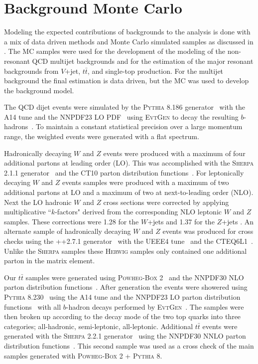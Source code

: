 \section{Background Monte Carlo} \label{sec:data:bkg_mc}

Modeling the expected contributions of backgrounds to the analysis is done with
a mix of data driven methods and Monte Carlo simulated samples as discussed in
.  The MC samples were used for the development of the
modeling of the non-resonant QCD multijet backgrounds and for the estimation
of the major resonant backgrounds from $V$+jet, $t\bar{t}$, and single-top
production.  For the multijet background the final estimation is data driven,
but the MC was used to develop the background model.

The QCD dijet events were simulated by the \textsc{Pythia} 8.186
generator~\cite{Sjostrand:2007gs} with the A14 tune and the NNPDF23 LO
PDF~\cite{Carrazza:2013axa} using \textsc{EvtGen} to decay the resulting
$b$-hadrons~\cite{LANGE2001152}.  To maintain a constant statistical precision
over a large momentum range, the weighted events were generated with a flat \pT
spectrum.

Hadronically decaying $W$ and $Z$ events were produced with a maximum of four
additional partons at leading order (LO).  This was accomplished with the
\textsc{Sherpa} 2.1.1 generator~\cite{Gleisberg:2008ta} and the CT10 parton
distribution functions~\cite{Lai:2010vv}.  For leptonically decaying $W$ and
$Z$ events samples were produced with a maximum of two additional partons at LO
and a maximum of two at next-to-leading order (NLO).  Next the LO hadronic $W$
and $Z$ cross sections were corrected by applying multiplicative ``$k$-factors"
derived from the corresponding NLO leptonic $W$ and $Z$ samples.  These corrections
were 1.28 for the $W$+jets and 1.37 for the $Z$+jets \cite{Aaboud:2018zba}. An
alternate sample of hadronically decaying $W$ and $Z$ events was produced for
cross checks using the ++2.7.1 generator~\cite{Bahr:2008pv} with
the UEEE4 tune~\cite{Buckley:2018wdv} and the CTEQ6L1~\cite{Pumplin:2002vw}.
Unlike the \textsc{Sherpa} samples these \textsc{Herwig} samples only contained
one additional parton in the matrix element.

Our $t\bar{t}$ samples were generated using \textsc{Powheg-Box}
2~\cite{Campbell2012} and the NNPDF30 NLO parton distribution
functions~\cite{Ball:2014uwa}. After generation the events were showered using
\textsc{Pythia} 8.230~\cite{Sjostrand:2014zea} using the A14 tune and the
NNPDF23 LO parton distribution functions~\cite{Carrazza:2013axa} with all
$b$-hadron decays performed by \textsc{EvtGen}~\cite{LANGE2001152}.  The
samples were then broken up according to the decay mode of the two top quarks
into three categories; all-hadronic, semi-leptonic, all-leptonic. Additional
$t\bar{t}$ events were generated with the \textsc{Sherpa} 2.2.1
generator~\cite{Gleisberg:2008ta} using the NNPDF30 NNLO parton distribution
functions~\cite{Ball:2014uwa}.  This second sample was used as a cross check of
the main samples generated with \textsc{Powheg-Box} 2 + \textsc{Pythia} 8.

